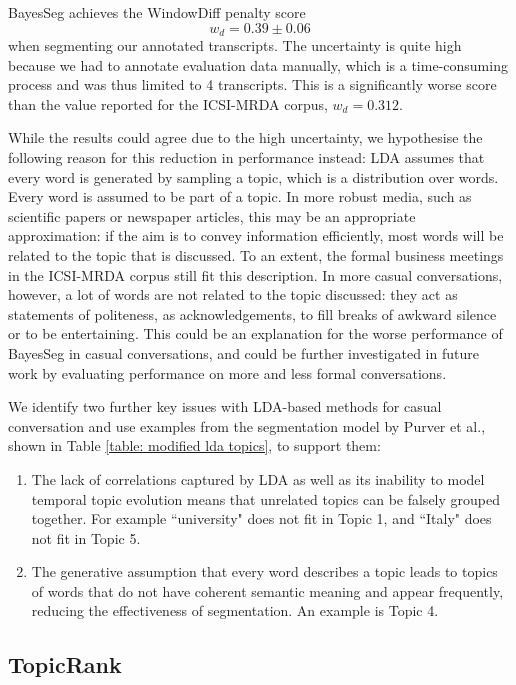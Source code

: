     BayesSeg achieves the WindowDiff penalty score
    \begin{equation}
     w_d = 0.39 \pm 0.06
    \end{equation} 
    when segmenting our annotated transcripts. The uncertainty is quite high because we had to annotate evaluation data manually, which is a time-consuming process and was thus limited to 4 transcripts. This is a significantly worse score than the value reported for the ICSI-MRDA corpus, $w_d = 0.312$\cite{eisenstein2008bayesian}.
    
    While the results could agree due to the high uncertainty, we hypothesise the following reason for this reduction in performance instead: LDA assumes that every word is generated by sampling a topic, which is a distribution over words. Every word is assumed to be part of a topic. In more robust media, such as scientific papers or newspaper articles, this may be an appropriate approximation: if the aim is to convey information efficiently, most words will be related to the topic that is discussed. To an extent, the formal business meetings in the ICSI-MRDA corpus still fit this description. In more casual conversations, however, a lot of words are not related to the topic discussed: they act as statements of politeness, as acknowledgements, to fill breaks of awkward silence or to be entertaining\cite{searle1965speech}. This could be an explanation for the worse performance of BayesSeg in casual conversations, and could be further investigated in future work by evaluating performance on more and less formal conversations.
    
      We identify two further key issues with LDA-based methods for casual conversation and use examples from the segmentation model by Purver et al., shown in Table \ref{table: modified lda topics}, to support them:
    \begin{enumerate}
        \item The lack of correlations captured by LDA as well as its inability to model temporal topic evolution means that unrelated topics can be falsely grouped together. For example ``university" does not fit in Topic 1, and ``Italy" does not fit in Topic 5.
        \item The generative assumption that every word describes a topic leads to topics of words that do not have coherent semantic meaning and appear frequently, reducing the effectiveness of segmentation. An example is Topic 4.
    \end{enumerate}
    
    
    
\subsection{TopicRank \label{method: topic rank}}
